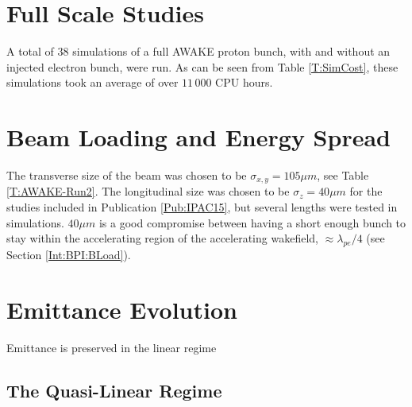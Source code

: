 \section{Full Scale Studies}
\label{Sim:Plasma}

A total of $38$ simulations of a full AWAKE proton bunch, with and without an injected electron bunch, were run.
As can be seen from Table \ref{T:SimCost}, these simulations took an average of over $11\,000$ CPU hours.



\section{Beam Loading and Energy Spread}
\label{Sim:BLoad}

The transverse size of the beam was chosen to be $\sigma_{x,y}=105\unit{\mu m}$, see Table \ref{T:AWAKE-Run2}.
The longitudinal size was chosen to be $\sigma_{z}=40\unit{\mu m}$ for the studies included in Publication \ref{Pub:IPAC15}, but several lengths were tested in simulations.
$40\unit{\mu m}$ is a good compromise between having a short enough bunch to stay within the accelerating region of the accelerating wakefield, $\approx \lambda_{pe}/4$ (see Section \ref{Int:BPI:BLoad}).

\section{Emittance Evolution}
\label{Sim:Emitt}

Emittance is preserved in the linear regime

\subsection{The Quasi-Linear Regime}
\label{Sim:QLin}

